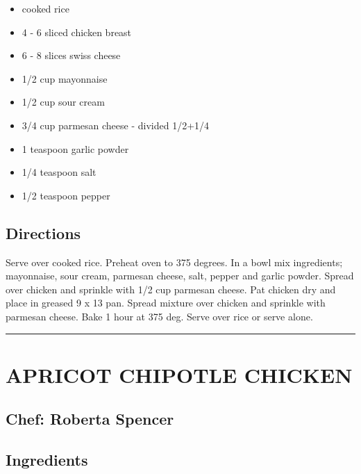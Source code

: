 \documentclass[
]{book}
\providecommand{\tightlist}{%
  \setlength{\itemsep}{0pt}\setlength{\parskip}{0pt}}
\begin{document}
\begin{itemize}
\tightlist
\item
  cooked rice
\item
  4 - 6 sliced chicken breast
\item
  6 - 8 slices swiss cheese
\item
  1/2 cup mayonnaise
\item
  1/2 cup sour cream
\item
  3/4 cup parmesan cheese - divided 1/2+1/4
\item
  1 teaspoon garlic powder
\item
  1/4 teaspoon salt
\item
  1/2 teaspoon pepper
\end{itemize}

\hypertarget{directions-39}{%
\subsection*{Directions}\label{directions-39}}


Serve over cooked rice. Preheat oven to 375 degrees. In a bowl
mix ingredients; mayonnaise, sour cream, parmesan cheese, salt,
pepper and garlic powder. Spread over chicken and sprinkle with 1/2 cup
parmesan cheese. Pat chicken dry and place in greased 9 x 13 pan.
Spread mixture over chicken and sprinkle with parmesan cheese.
Bake 1 hour at 375 deg. Serve over rice or serve alone.

\begin{center}\rule{0.5\linewidth}{0.5pt}\end{center}

\hypertarget{apricot-chipotle-chicken}{%
\section*{APRICOT CHIPOTLE CHICKEN}\label{apricot-chipotle-chicken}}


\hypertarget{chef-roberta-spencer-13}{%
\subsection*{Chef: Roberta Spencer}\label{chef-roberta-spencer-13}}


\hypertarget{ingredients-40}{%
\subsection*{Ingredients}\label{ingredients-40}}
\end{document}
